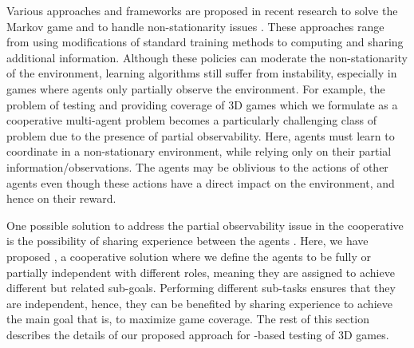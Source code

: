 Various approaches and frameworks are proposed in recent research to solve the Markov game \cite{DBLP:journals/corr/abs-2011-00583, zhang2021multi} and to handle non-stationarity issues \cite{DBLP:journals/corr/abs-1906-04737}. These approaches range from using modifications of standard \rlacronym training methods to computing and sharing additional information. 
Although these policies can moderate the non-stationarity of the environment, learning algorithms still suffer from instability, 
especially in games where agents only partially observe the environment.
For example, the problem of testing and providing coverage of 3D games which we formulate as a cooperative multi-agent \rl problem becomes a particularly challenging class of problem due to the presence of partial observability. Here, agents must learn to coordinate in a non-stationary environment, while relying only on their partial information/observations. The agents may be oblivious to the actions of other agents even though these actions have a direct impact on the environment, and hence on their reward. 

One possible solution to address the partial observability issue in the cooperative \marlacronym is the possibility of sharing experience between the agents \cite{gerstgrasser2024selectively}. %
Here, we have proposed \approach, a cooperative \marlacronym solution where we define the agents to be fully or partially independent with different roles, meaning they are assigned to achieve different but related sub-goals. Performing different sub-tasks ensures that they are independent, hence, they can be benefited by sharing experience to achieve the main goal that is, to maximize game coverage. 
%
The rest of this section describes the details of our proposed approach \approach for \marlacronym-based testing of 3D games.   

